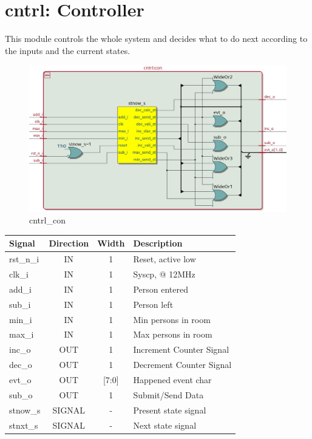 \documentclass[12pt,a4 paper] {report}
\begin{document}
\newpage

\section{cntrl: Controller}
This module controls the whole system and decides what to do next according to the inputs and the current states.
\begin{figure}[h]
	\centering	
	\includegraphics[scale=0.25]{../png/cntrl_con.png}
	\caption{cntrl\_con}
\end{figure}
\begin{center}
	\begin{tabular}{ | p{2cm} | c | c | p{5cm} |}
		\hline
		\textbf{Signal} & \textbf{Direction} & \textbf{Width} & \textbf{Description} \\
		\hline
		\hline
		rst\_n\_i & IN & 1 & Reset, active low \\
		\hline
		clk\_i & IN & 1 & Syscp, @ 12MHz \\
		\hline
		add\_i & IN & 1 & Person entered \\
		\hline
		sub\_i & IN & 1 & Person left \\
		\hline
		min\_i & IN & 1 & Min persons in room \\
		\hline
		max\_i & IN & 1 & Max persons in room \\
		\hline
		inc\_o & OUT & 1 & Increment Counter Signal \\
		\hline
		dec\_o & OUT & 1 & Decrement Counter Signal \\
		\hline
		evt\_o & OUT & [7:0] & Happened event char \\
		\hline
		sub\_o & OUT & 1 & Submit/Send Data \\
		\hline
		\hline
		stnow\_s & SIGNAL & - & Present state signal \\
		\hline
		stnxt\_s & SIGNAL & - & Next state signal \\
		\hline	
	\end{tabular}
\end{center}
\end{document}
